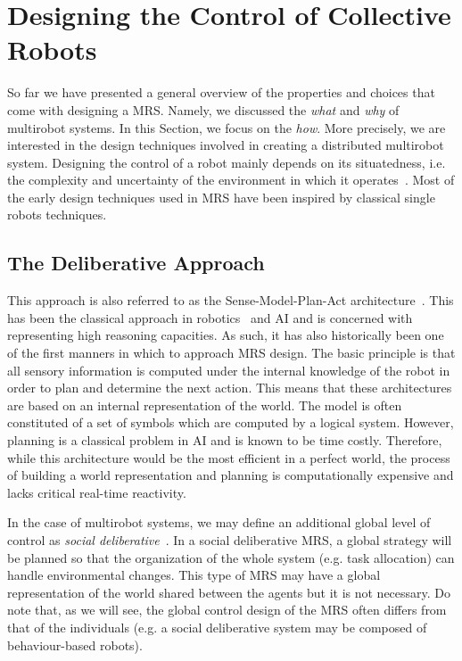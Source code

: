 

\section{Designing the Control of Collective Robots}

  So far we have presented a general overview of the properties and choices that come with designing a MRS. Namely, we discussed the \emph{what} and \emph{why} of multirobot systems. In this Section, we focus on the \emph{how}. More precisely, we are interested in the design techniques involved in creating a distributed multirobot system. Designing the control of a robot mainly depends on its situatedness, i.e. the complexity and uncertainty of the environment in which it operates~\parencite{Mataric2008}. Most of the early design techniques used in MRS have been inspired by classical single robots techniques.

  \subsection{The Deliberative Approach}

    This approach is also referred to as the Sense-Model-Plan-Act architecture~\parencite{Albus1991, Iocchi2001, Mataric2008}. This has been the classical approach in robotics~\parencite{Nilsson1984} and AI and is concerned with representing high reasoning capacities. As such, it has also historically been one of the first manners in which to approach MRS design. The basic principle is that all sensory information is computed under the internal knowledge of the robot in order to plan and determine the next action. This means that these architectures are based on an internal representation of the world. The model is often constituted of a set of symbols which are computed by a logical system. However, planning is a classical problem in AI and is known to be time costly. Therefore, while this architecture would be the most efficient in a perfect world, the process of building a world representation and planning is computationally expensive and lacks critical real-time reactivity.

    In the case of multirobot systems, we may define an additional global level of control as \emph{social deliberative}~\parencite{Iocchi2001}. In a social deliberative MRS, a global strategy will be planned so that the organization of the whole system (e.g. task allocation) can handle environmental changes. This type of MRS may have a global representation of the world shared between the agents but it is not necessary. Do note that, as we will see, the global control design of the MRS often differs from that of the individuals (e.g. a social deliberative system may be composed of behaviour-based robots).

